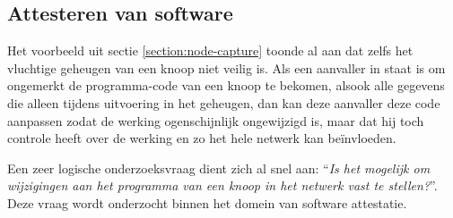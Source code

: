 \subsection{Attesteren van software}
\label{subsection:attestation}

Het voorbeeld uit sectie \ref{section:node-capture} toonde al aan dat zelfs het
vluchtige geheugen van een knoop niet veilig is. Als een aanvaller in staat is
om ongemerkt de programma-code van een knoop te bekomen, alsook alle gegevens
die alleen tijdens uitvoering in het geheugen, dan kan deze aanvaller deze code
aanpassen zodat de werking ogenschijnlijk ongewijzigd is, maar dat hij toch
controle heeft over de werking en zo het hele netwerk kan be\"invloeden.

Een zeer logische onderzoeksvraag dient zich al snel aan: ``\emph{Is het
mogelijk om wijzigingen aan het programma van een knoop in het netwerk vast te
stellen?}''. Deze vraag wordt onderzocht binnen het domein van software
attestatie.

\cite{castelluccia2009difficulty}
